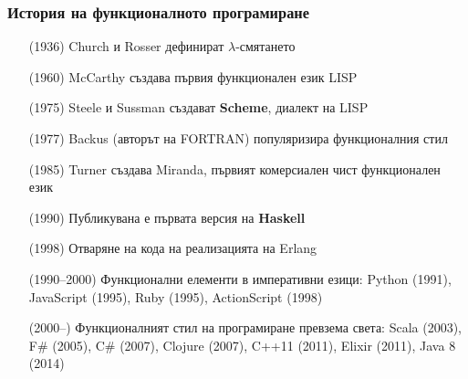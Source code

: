 \documentclass{beamer}
\begin{document}
\begin{frame}
  \frametitle{История на функционалното програмиране}

  \setlength{\leftmargini}{11ex}
  \begin{itemize}[<+->]
  \item[(1936)] Church и Rosser дефинират $\lambda$-смятането
  \item[(1960)] McCarthy създава първия функционален език LISP
  \item[(1975)] Steele и Sussman създават \textbf{Scheme}, диалект на LISP
  \item[(1977)] Backus (авторът на FORTRAN) популяризира функционалния стил
  \item[(1985)] Turner създава Miranda, първият комерсиален чист функционален език
  \item[(1990)] Публикувана е първата версия на \textbf{Haskell}
  \item[(1998)] Отваряне на кода на реализацията на Erlang
  \item[(1990--2000)] Функционални елементи в императивни езици: Python (1991), JavaScript (1995), Ruby (1995), ActionScript (1998)
  \item[(2000--)] Функционалният стил на програмиране превзема света: Scala (2003), F\# (2005), C\# (2007), Clojure (2007), C++11 (2011), Elixir (2011), Java 8 (2014)
  \end{itemize}
\end{frame}
\end{document}
